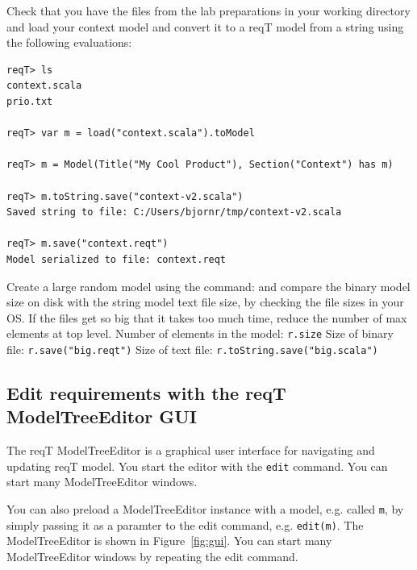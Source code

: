 \documentclass[11pt]{article}
\begin{document}
\begin{framed}\noindent
Check that you have the files from the lab preparations in your working directory and load your context model and convert it to a reqT model from a string using the following evaluations: 
{\scriptsize \begin{verbatim}
reqT> ls
context.scala
prio.txt

reqT> var m = load("context.scala").toModel

reqT> m = Model(Title("My Cool Product"), Section("Context") has m)

reqT> m.toString.save("context-v2.scala")
Saved string to file: C:/Users/bjornr/tmp/context-v2.scala

reqT> m.save("context.reqt")
Model serialized to file: context.reqt
\end{verbatim}}
\noindent Create a large random model using the command:  \newline and compare the binary model size on disk with the string model text file size, by checking the file sizes in your OS. If the files get so big that it takes too much time, reduce the number of max elements at top level.\newline
\newline Number of elements in the model: {\footnotesize\verb+r.size+} \underline{\hspace{2cm}} 
\newline Size of binary file: {\footnotesize\verb+r.save("big.reqt")+}  \underline{\hspace{2cm}} 
\newline Size of text file: {\footnotesize\verb+r.toString.save("big.scala")+} \underline{\hspace{2cm}}
\end{framed}

\subsection{Edit requirements with the reqT ModelTreeEditor GUI}

The reqT ModelTreeEditor is a graphical user interface for navigating and updating reqT model. You start the editor with the \verb+edit+ command. You can start many ModelTreeEditor windows. 

You can also preload a ModelTreeEditor instance with a model, e.g. called \verb+m+, by simply passing it as a paramter to the edit command, e.g. \verb+edit(m)+. The ModelTreeEditor is shown in Figure~\ref{fig:gui}. You can start many ModelTreeEditor windows by repeating the edit command.
\end{document}
